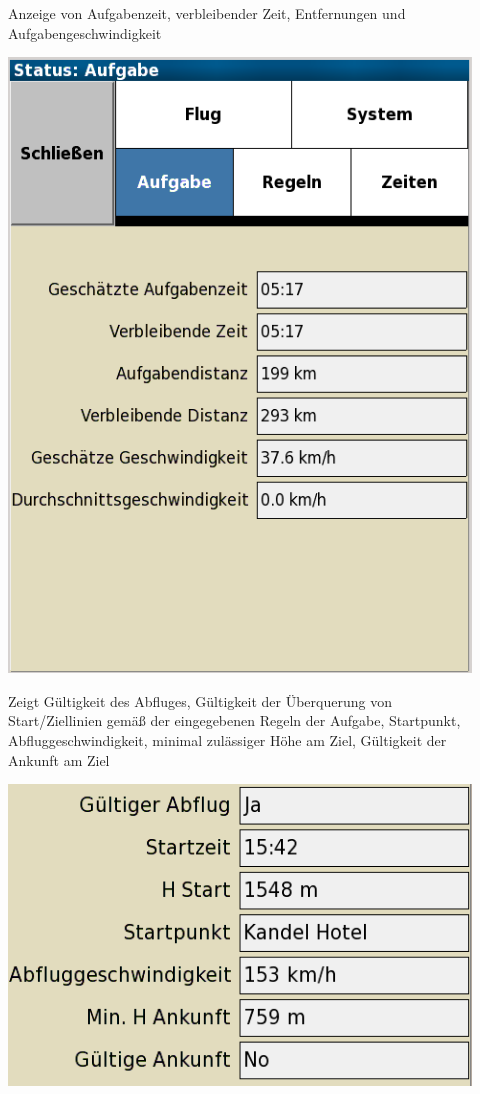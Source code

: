 \begin{description}
\item[] Anzeige von Aufgabenzeit, verbleibender Zeit, Entfernungen und Aufgabengeschwindigkeit
\begin{center}
\includegraphics[angle=0,width=0.5\linewidth,keepaspectratio='true']{figures/status-task.png}
\end{center}

\item[] Zeigt Gültigkeit des Abfluges, Gültigkeit der Überquerung von Start/Ziellinien gemäß der eingegebenen Regeln der Aufgabe, Startpunkt, Abfluggeschwindigkeit, minimal zulässiger Höhe am Ziel, Gültigkeit der Ankunft am Ziel
\begin{center}
\includegraphics[angle=0,width=0.5\linewidth,keepaspectratio='true']{figures/status-rules.png}
\end{center}


\end{description}
